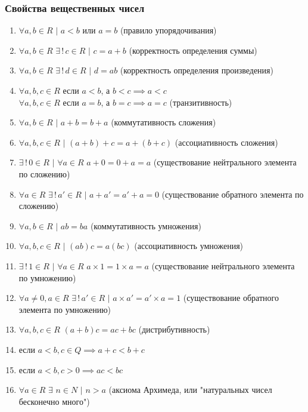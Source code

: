 \documentclass[12pt]{article}
\begin{document}
    \subsubsection*{Свойства вещественных чисел}
    \begin{enumerate}
        \item $\forall a,b \in R$ $|$ $a < b$ или $a = b$ (правило упорядочивания)
        \item $\forall a,b \in R$ $\exists\,!\,c \in R$ $|$ $ c = a + b$ (корректность определения суммы)
        \item $\forall a,b \in R$ $\exists\,!\,d \in R$ $|$ $ d = ab$ (корректность определения произведения)
        \item $\forall a,b,c \in R$ если $a < b$, а $b < c \implies a < c$\\$\forall a,b,c \in R$ если $a = b$, а $b = c \implies a = c$ (транзитивность)
        \item $\forall a,b \in R$ $|$ $a+b=b+a$ (коммутативность сложения)
        \item $\forall a,b,c \in R$ $|$ $(a+b)+c = a+(b+c)$ (ассоциативность сложения)
        \item $\exists\,!\,0 \in R$ $|$ $\forall a \in R$ $a+0 = 0+a = a$ (существование нейтрального элемента по сложению)
        \item $\forall a \in R$ $\exists\,!\,a' \in R$ $|$ $a+a'=a'+a = 0$ (существование обратного элемента по сложению)
        \item $\forall a,b \in R$ $|$ $ab=ba$ (коммутативность умножения)
        \item $\forall a,b,c \in R$ $|$ $(ab)c = a(bc)$ (ассоциативность умножения)
        \item $\exists\,!\,1 \in R$ $|$ $\forall a \in R$ $a \times 1 = 1 \times a = a$ (существование нейтрального элемента по умножению)
        \item $\forall a \ne 0, a \in R$ $\exists\,!\,a' \in R$ $|$ $a \times a'=a' \times a = 1$ (существование обратного элемента по умножению)
        \item $\forall a,b,c \in R$ $(a + b)c = ac + bc$ (дистрибутивность)
        \item если $a < b, c \in Q \implies a+c < b+c$
        \item если $a < b, c > 0 \implies ac < bc$
        \item $\forall a \in R$ $\exists$ $n \in N$ $|$ $n > a$ (аксиома Архимеда, или "натуральных чисел бесконечно много")
    \end{enumerate}
\end{document}
